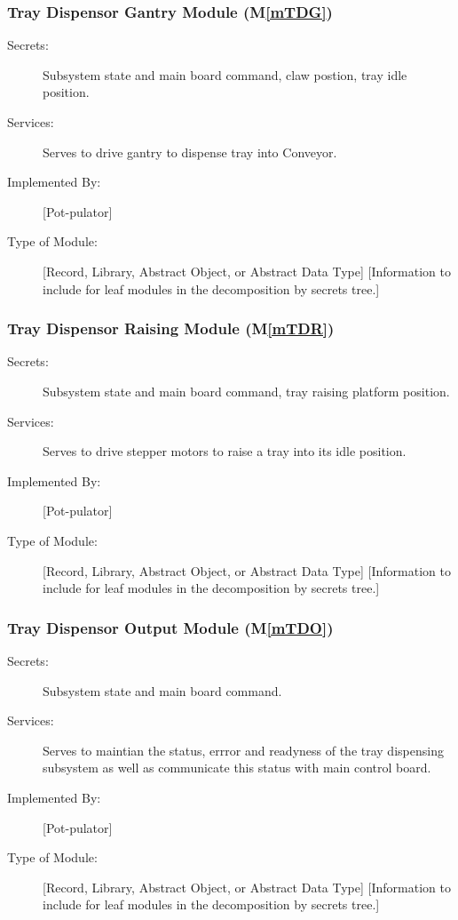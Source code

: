 \documentclass[12pt, titlepage]{article}
\newcommand{\mref}[1]{M\ref{#1}}
\begin{document}
\subsubsection{Tray Dispensor Gantry Module (\mref{mTDG})}
\begin{description}
\item[Secrets:] Subsystem state and main board command, claw postion, tray idle position.
\item[Services:] Serves to drive gantry to dispense tray into Conveyor.
\item[Implemented By:] [Pot-pulator]
\item[Type of Module:] [Record, Library, Abstract Object, or Abstract Data Type]
  [Information to include for leaf modules in the decomposition by secrets tree.]
\end{description}

\subsubsection{Tray Dispensor Raising Module (\mref{mTDR})}
\begin{description}
\item[Secrets:] Subsystem state and main board command, tray raising platform position.
\item[Services:] Serves to drive stepper motors to raise a tray into its idle position.
\item[Implemented By:] [Pot-pulator]
\item[Type of Module:] [Record, Library, Abstract Object, or Abstract Data Type]
  [Information to include for leaf modules in the decomposition by secrets tree.]
\end{description}

\subsubsection{Tray Dispensor Output Module (\mref{mTDO})}
\begin{description}
\item[Secrets:] Subsystem state and main board command.
\item[Services:] Serves to maintian the status, errror and readyness of the tray dispensing subsystem as well as
communicate this status with main control board.
\item[Implemented By:] [Pot-pulator]
\item[Type of Module:] [Record, Library, Abstract Object, or Abstract Data Type]
  [Information to include for leaf modules in the decomposition by secrets tree.]
\end{description}
\end{document}
